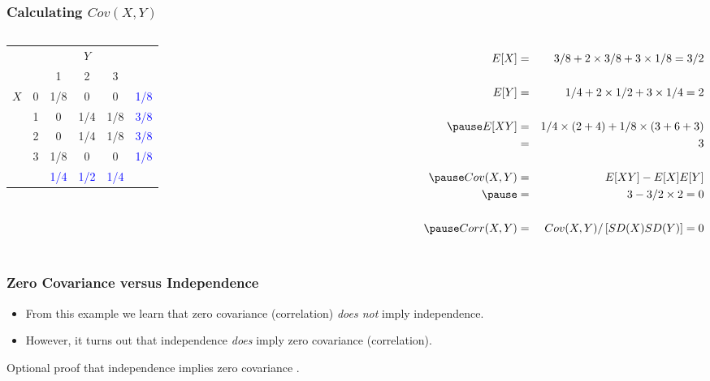 \begin{frame}
\frametitle{Calculating $Cov(X,Y)$}

\begin{columns}

\begin{table}
\footnotesize
\begin{tabular}{|cc|ccc|c|}
\hline
&&\multicolumn{3}{c|}{$Y$}&\\
&&1 & 2&3&\\
\hline
\multirow{4}{*}{$X$}
&0& \multicolumn{1}{|c}{\alert{1/8}} & \alert{0}& \alert{0}&\textcolor{blue}{1/8}\\
&1& \multicolumn{1}{|c}{\alert{0}} & \alert{1/4}&\alert{1/8}&\textcolor{blue}{3/8}\\
&2& \multicolumn{1}{|c}{\alert{0}} & \alert{1/4}&\alert{1/8}&\textcolor{blue}{3/8}\\
&3& \multicolumn{1}{|c}{\alert{1/8}} & \alert{0}&\alert{0}&\textcolor{blue}{1/8}\\
\hline
&&\textcolor{blue}{1/4}&\textcolor{blue}{1/2}&\textcolor{blue}{1/4}&\\
\hline
\end{tabular}
\vspace{6em}
\end{table}


\footnotesize
\begin{eqnarray*}
	E[X] &=&3/8 + 2 \times 3/8 + 3 \times 1/8 = 3/2\\\\ 
	E[Y] &=&1/4 + 2 \times 1/2 + 3 \times 1/4 = 2 \\ \\ \pause
	E[XY] &=& 1/4\times ( 2 + 4) + 1/8 \times (3 + 6 + 3)\\ 
		&=& 3\\ \\ \pause
	Cov(X,Y) &=& E[XY] - E[X]E[Y]\\ \pause
			&=& 3 - 3/2\times 2 = 0\\\\ \pause
	Corr(X,Y) &=& Cov(X,Y)/\left[SD(X) SD(Y) \right] = 0
\end{eqnarray*}

\end{columns}

\end{frame}
\begin{frame}
  \frametitle{Zero Covariance versus Independence}
  \begin{itemize}
    \item From this example we learn that zero covariance (correlation) \emph{does not} imply independence.
    \item However, it turns out that independence \emph{does} imply zero covariance (correlation).
  \end{itemize}

\vspace{2em}
\normalsize 
Optional proof that independence implies zero covariance \textcolor{blue}{\href{http://ditraglia.com/Econ103Public/OptionalProofs.pdf}{}}.
\end{frame}

